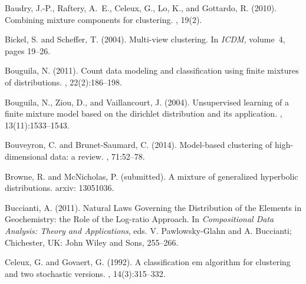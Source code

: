 \documentclass[10pt, a4paper]{article}
\begin{document}
\begin{thebibliography}{00}
Baudry, J.-P., Raftery, A.~E., Celeux, G., Lo, K., and Gottardo, R. (2010).
\newblock Combining mixture components for clustering.
, 19(2).

Bickel, S. and Scheffer, T. (2004).
\newblock Multi-view clustering.
\newblock In {\em ICDM}, volume~4, pages 19--26.


Bouguila, N. (2011).
\newblock Count data modeling and classification using finite mixtures of
  distributions.
, 22(2):186--198.

Bouguila, N., Ziou, D., and Vaillancourt, J. (2004).
\newblock Unsupervised learning of a finite mixture model based on the
  dirichlet distribution and its application.
, 13(11):1533--1543.

Bouveyron, C. and Brunet-Saumard, C. (2014).
\newblock Model-based clustering of high-dimensional data: a review.
, 71:52--78.

Browne, R. and McNicholas, P. (submitted).
\newblock A mixture of generalized hyperbolic distributions. arxiv: 13051036.

Buccianti, A. (2011). 
\newblock Natural Laws Governing the Distribution of the Elements in Geochemistry: the Role of the Log-ratio Approach.
\newblock In {\em Compositional Data Analysis: Theory
and Applications}, eds. V. Pawlowsky-Glahn and A. Buccianti; Chichester, UK: John Wiley and Sons, 255--266.

Celeux, G. and Govaert, G. (1992).
\newblock A classification em algorithm for clustering and two stochastic
  versions.
, 14(3):315--332.


\end{thebibliography}
\end{document}
